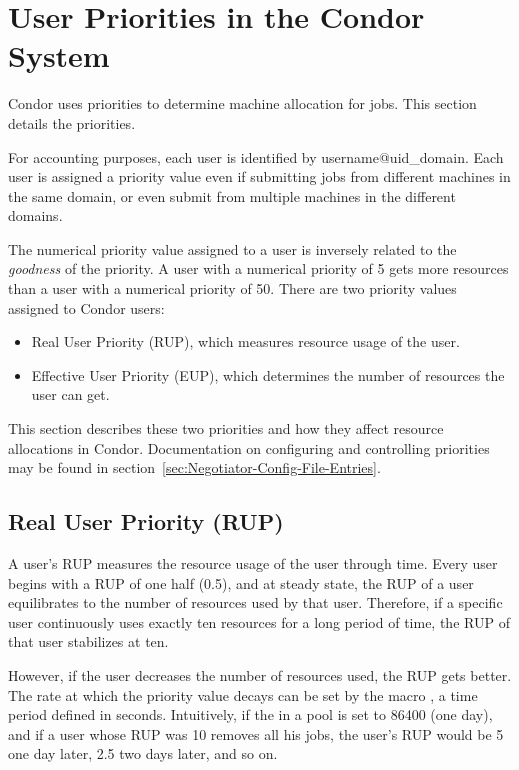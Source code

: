 \section{\label{sec:UserPrio}
User Priorities in the Condor System}
Condor uses priorities to determine machine allocation for jobs.
This section details the priorities.

For accounting purposes, each user is identified by username@uid\_domain.
Each user is assigned a priority value even if submitting jobs from
different machines in the same domain, or even submit from multiple machines 
in the different domains.

The numerical priority value assigned to a user is inversely related to the 
\emph{goodness} of the priority.
A user with a numerical priority of 5 gets 
more resources than a user with a numerical priority of 50.
There are two 
priority values assigned to Condor users:
\begin{itemize}
	\item Real User Priority (RUP), which measures resource usage of the 
		user.
	\item Effective User Priority (EUP), which determines the number of
		resources the user can get.
\end{itemize}
This section describes these two priorities and how they affect resource
allocations in Condor.
Documentation on configuring and controlling 
priorities may be found in section~\ref{sec:Negotiator-Config-File-Entries}.

\subsection{Real User Priority (RUP)}
A user's RUP measures the resource usage of the user 
through time.
Every user begins with a RUP of one half (0.5), and
at steady state, the RUP of a user equilibrates to the number of resources 
used by that user.  Therefore, if a specific user continuously uses exactly 
ten resources for a long period of time, the RUP of that user stabilizes at 
ten.

However, if the user decreases the number of resources used, the RUP
gets better.  The rate at which the priority value decays 
can be set by the macro , a time period 
defined in seconds.   Intuitively, if the  in a pool 
is set to 86400 (one day), and if a user whose RUP was 10 removes all his 
jobs, the user's RUP would be 5 one day later, 2.5 two days later,
and so on.

